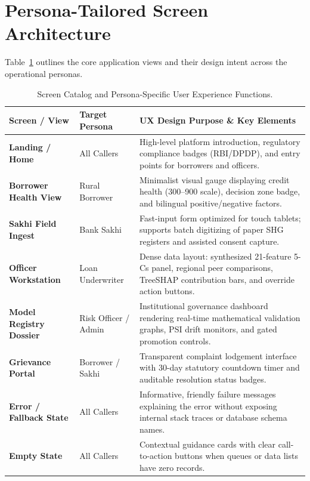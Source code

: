 \section{Persona-Tailored Screen Architecture}
Table~\ref{tab:screen_catalog} outlines the core application views and their design intent across the operational personas.

\begin{table}[H]
\centering
\small
\renewcommand{\arraystretch}{1.2}
\begin{tabularx}{\textwidth}{p{3.0cm} p{3.2cm} X}
  \toprule
  \textbf{Screen / View} & \textbf{Target Persona} & \textbf{UX Design Purpose \& Key Elements} \\
  \midrule
  \textbf{Landing / Home} & All Callers & High-level platform introduction, regulatory compliance badges (RBI/DPDP), and entry points for borrowers and officers. \\
  \addlinespace
  \textbf{Borrower Health View} & Rural Borrower & Minimalist visual gauge displaying credit health (300--900 scale), decision zone badge, and bilingual positive/negative factors. \\
  \addlinespace
  \textbf{Sakhi Field Ingest} & Bank Sakhi & Fast-input form optimized for touch tablets; supports batch digitizing of paper SHG registers and assisted consent capture. \\
  \addlinespace
  \textbf{Officer Workstation} & Loan Underwriter & Dense data layout: synthesized 21-feature 5-Cs panel, regional peer comparisons, TreeSHAP contribution bars, and override action buttons. \\
  \addlinespace
  \textbf{Model Registry Dossier} & Risk Officer / Admin & Institutional governance dashboard rendering real-time mathematical validation graphs, PSI drift monitors, and gated promotion controls. \\
  \addlinespace
  \textbf{Grievance Portal} & Borrower / Sakhi & Transparent complaint lodgement interface with 30-day statutory countdown timer and auditable resolution status badges. \\
  \addlinespace
  \textbf{Error / Fallback State} & All Callers & Informative, friendly failure messages explaining the error without exposing internal stack traces or database schema names. \\
  \addlinespace
  \textbf{Empty State} & All Callers & Contextual guidance cards with clear call-to-action buttons when queues or data lists have zero records. \\
  \bottomrule
\end{tabularx}
\caption{Screen Catalog and Persona-Specific User Experience Functions.}
\label{tab:screen_catalog}
\end{table}

